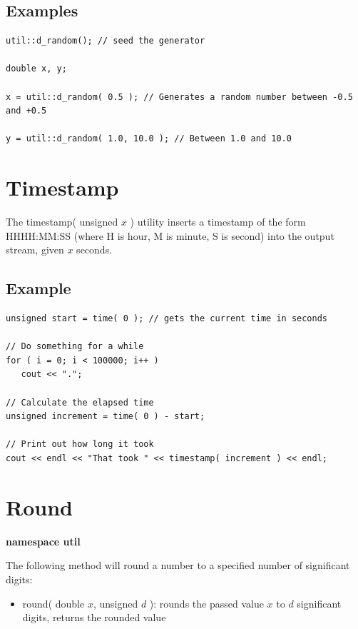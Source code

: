 \documentclass{report}
\begin{document}
\subsection{Examples}

\begin{verbatim}
util::d_random(); // seed the generator

double x, y;

x = util::d_random( 0.5 ); // Generates a random number between -0.5
and +0.5

y = util::d_random( 1.0, 10.0 ); // Between 1.0 and 10.0
\end{verbatim}

\section{Timestamp}

The timestamp( unsigned $x$ ) utility inserts a timestamp of the form
HHHH:MM:SS (where H is hour, M is minute, S is second) into the output
stream, given $x$ seconds.

\subsection{Example}
\begin{verbatim}
unsigned start = time( 0 ); // gets the current time in seconds

// Do something for a while
for ( i = 0; i < 100000; i++ )
   cout << ".";

// Calculate the elapsed time
unsigned increment = time( 0 ) - start;

// Print out how long it took
cout << endl << "That took " << timestamp( increment ) << endl;
\end{verbatim}

\section{Round}

{\bf namespace util}

The following method will round a number to a specified number of
significant digits:

\begin{itemize}
\item round( double $x$, unsigned $d$ ): rounds the passed value $x$
      to $d$ significant digits, returns the rounded value
\end{itemize}
\end{document}
